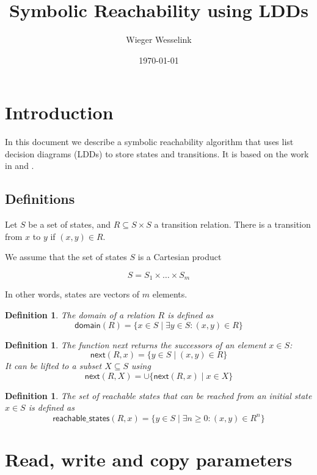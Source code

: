 \documentclass{article}
\title{Symbolic Reachability using LDDs}
\author{Wieger Wesselink}
\date{\today}
\newtheorem{definition}[theorem]{Definition}
\begin{document}
\maketitle

\section{Introduction}
In this document we describe a symbolic reachability algorithm that uses list decision diagrams (LDDs) to store states and transitions.
It is based on the work in \cite{MeijerBlomPol2008} and \cite{Meijer2019}.

\subsection{Definitions}
Let $S$ be a set of states, and $R \subseteq S \times S$ a transition relation. There is a transition from $x$ to $y$ if $(x,y) \in R$.

\noindent
We assume that the set of states $S$ is a Cartesian product

\[
S = S_1 \times \ldots \times S_m
\]

\noindent
In other words, states are vectors of $m$ elements. \\

\begin{definition}
The domain of a relation $R$ is defined as
\[
\textsf{domain}(R) = \{ x \in S \mid \exists y \in S:  (x,y) \in R \}
\]
\end{definition}

\begin{definition}
The function \textsf{next} returns the successors of an element $x \in S$:
\[
\textsf{next}(R, x) = \{ y \in S \mid (x,y) \in R \}
\]
It can be lifted to a subset $X \subseteq S$ using
\[
\textsf{next}(R, X) = \cup \{ \textsf{next}(R, x) \mid x \in X \}
\]
\end{definition}

\begin{definition}
The set of reachable states that can be reached from an initial state $x \in S$ is defined as
\[
    \textsf{reachable\_states}(R, x) = \{ y \in S \mid \exists n \geq 0: (x, y) \in R^n \}
\]
\end{definition}

\section{Read, write and copy parameters}
\end{document}
